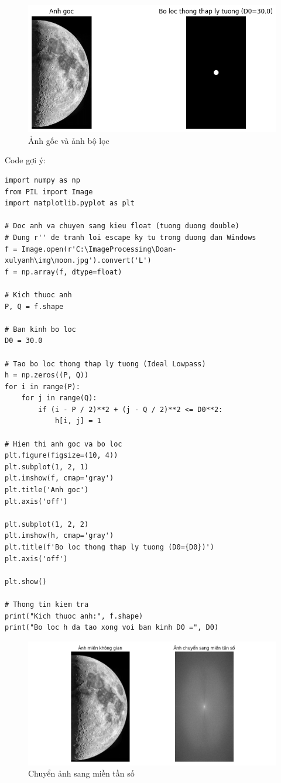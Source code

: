 \documentclass[12pt,a4paper]{report}
\numberwithin{equation}{section}
\theoremstyle{definition} %
\begin{document}
\begin{figure}[H]
\centering
\includegraphics[width=0.9\linewidth]{img/Ideallowpass.png}
\caption{Ảnh gốc và ảnh bộ lọc}
\end{figure}

Code gợi ý: 
\begin{lstlisting}
import numpy as np
from PIL import Image
import matplotlib.pyplot as plt

# Doc anh va chuyen sang kieu float (tuong duong double)
# Dung r'' de tranh loi escape ky tu trong duong dan Windows
f = Image.open(r'C:\ImageProcessing\Doan-xulyanh\img\moon.jpg').convert('L')
f = np.array(f, dtype=float)

# Kich thuoc anh
P, Q = f.shape

# Ban kinh bo loc
D0 = 30.0

# Tao bo loc thong thap ly tuong (Ideal Lowpass)
h = np.zeros((P, Q))
for i in range(P):
    for j in range(Q):
        if (i - P / 2)**2 + (j - Q / 2)**2 <= D0**2:
            h[i, j] = 1

# Hien thi anh goc va bo loc
plt.figure(figsize=(10, 4))
plt.subplot(1, 2, 1)
plt.imshow(f, cmap='gray')
plt.title('Anh goc')
plt.axis('off')

plt.subplot(1, 2, 2)
plt.imshow(h, cmap='gray')
plt.title(f'Bo loc thong thap ly tuong (D0={D0})')
plt.axis('off')

plt.show()

# Thong tin kiem tra
print("Kich thuoc anh:", f.shape)
print("Bo loc h da tao xong voi ban kinh D0 =", D0)

\end{lstlisting}
\begin{figure}[H]
\centering
\includegraphics[width=0.9\linewidth]{img/moonFrequencydomain.png}
\caption{Chuyển ảnh sang miền tần số}
\end{figure}
\end{document}
